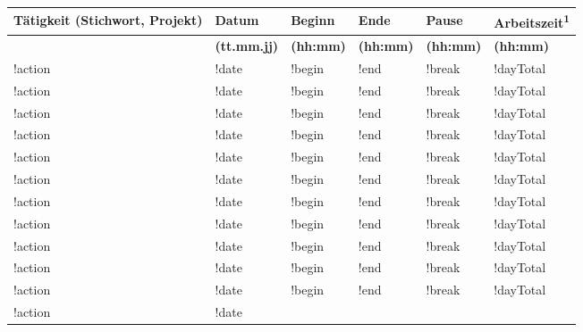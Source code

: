 \documentclass[]{scrartcl}
\begin{document}
	\large
	\begin{center}
		\begin{tabular}{| P{6.7cm} | P{2cm} | P{1.8cm} | P{1.8cm} | P{1.8cm} | P{2.4cm} |}
			\hline
			\textbf{T\"atigkeit (Stichwort, Projekt)}
			& \textbf{Datum}
			& \textbf{Beginn}
			& \textbf{Ende}
			& \textbf{Pause}
			& \textbf{Arbeitszeit\textsuperscript{1}}\\
			\hline
			& \textbf{(tt.mm.jj)}
			& \textbf{(hh:mm)}
			& \textbf{(hh:mm)}
			& \textbf{(hh:mm)}
			& \textbf{(hh:mm)}\\
			\hline
			\mbox{!action}
			& \mbox{!date}
			& \mbox{!begin}
			& \mbox{!end}
			& \mbox{!break}
			& \mbox{!dayTotal}\\
			\hline
			\mbox{!action}
			& \mbox{!date}
			& \mbox{!begin}
			& \mbox{!end}
			& \mbox{!break}
			& \mbox{!dayTotal}\\
			\hline
			\mbox{!action}
			& \mbox{!date}
			& \mbox{!begin}
			& \mbox{!end}
			& \mbox{!break}
			& \mbox{!dayTotal}\\
			\hline
			\mbox{!action}
			& \mbox{!date}
			& \mbox{!begin}
			& \mbox{!end}
			& \mbox{!break}
			& \mbox{!dayTotal}\\
			\hline
			\mbox{!action}
			& \mbox{!date}
			& \mbox{!begin}
			& \mbox{!end}
			& \mbox{!break}
			& \mbox{!dayTotal}\\
			\hline
			\mbox{!action}
			& \mbox{!date}
			& \mbox{!begin}
			& \mbox{!end}
			& \mbox{!break}
			& \mbox{!dayTotal}\\
			\hline
			\mbox{!action}
			& \mbox{!date}
			& \mbox{!begin}
			& \mbox{!end}
			& \mbox{!break}
			& \mbox{!dayTotal}\\
			\hline
			\mbox{!action}
			& \mbox{!date}
			& \mbox{!begin}
			& \mbox{!end}
			& \mbox{!break}
			& \mbox{!dayTotal}\\
			\hline
			\mbox{!action}
			& \mbox{!date}
			& \mbox{!begin}
			& \mbox{!end}
			& \mbox{!break}
			& \mbox{!dayTotal}\\
			\hline
			\mbox{!action}
			& \mbox{!date}
			& \mbox{!begin}
			& \mbox{!end}
			& \mbox{!break}
			& \mbox{!dayTotal}\\
			\hline
			\mbox{!action}
			& \mbox{!date}
			& \mbox{!begin}
			& \mbox{!end}
			& \mbox{!break}
			& \mbox{!dayTotal}\\
			\hline
			\mbox{!action}
			& \mbox{!date}

\end{tabular}
\end{center}
\end{document}
